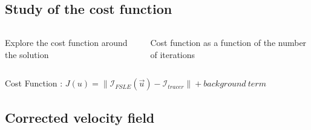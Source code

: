 \documentclass[compress,slidescentered,notes=show]{beamer}
\begin{document}
	\subsection[Cost function]{Study of the cost function}
\begin{frame}
 \centering

  \begin{center}
  \end{center}
  \begin{columns}
    \begin{column}{0.49\textwidth}
    \begin{center}
     Explore the cost function around the solution \\
     \end{center}
    \end{column}
    \begin{column}{0.49\textwidth}
     \begin{center}
     Cost function as a function of the number of iterations \\
    \end{center}
     \end{column}
     \end{columns}
 \begin{block}{}
  {Cost Function : $J(u)=\|\mathcal{I}_{FSLE}(\vec{u})- \mathcal{I}_{tracer}\| + background\ term $}
  \end{block}
\end{frame}

	\subsection[Corrections]{Corrected velocity field}
\begin{frame}
\end{frame}
\end{document}
